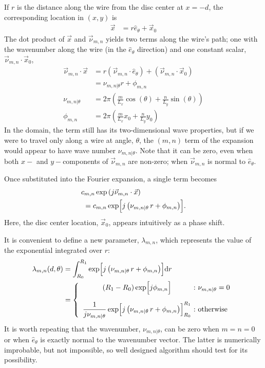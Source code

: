 \documentclass{article}
\def\d{\mathrm{d}}
\def\x{\vec{x}}
\def\eth{\hat{e}_\theta}
\def\vnu{\vec{\nu}_{m,n}}
\def\nuth{\nu_{m,n|\theta}}
\def\pmn{\phi_{m,n}}
\begin{document}
If $r$ is the distance along the wire from the disc center at $x=-d$, the corresponding location in $(x,y)$ is
\begin{align}
\x &= r \eth + \x_0
\end{align}
The dot product of $\x$ and $\vnu$ yields two terms along the wire's path; one with the wavenumber along the wire (in the $\eth$ direction) and one constant scalar, $\vnu \cdot \x_0$,
\begin{align}
\vnu \cdot \x &= r (\vnu \cdot \hat{e}_\theta) + (\vnu \cdot \x_0)\nonumber\\
 &= \nu_{m,n|\theta} r + \pmn\\
\nuth &= 2\pi \left( \frac{m}{L_x} \cos(\theta) + \frac{n}{L_y} \sin(\theta) \right)\\
\pmn &= 2\pi \left( \frac{m}{L_x} x_0 + \frac{n}{L_y} y_0 \right)
\end{align}
In the domain, the term still has its two-dimensional wave properties, but if we were to travel only along a wire at angle, $\theta$, the $(m,n)$ term of the expansion would appear to have wave number $\nuth$.  Note that it can be zero, even when both $x-$ and $y-$components of $\vnu$ are non-zero; when $\vnu$ is normal to $\eth$.

Once substituted into the Fourier expansion, a single term becomes
\begin{align*}
c_{m,n} \exp\left(j \vnu \cdot \x \right)\hspace{-8em}&\\
&= c_{m,n} \exp\Bigl[j \left(\nuth\,r + \pmn \right)\Bigr].
\end{align*}
Here, the disc center location, $\x_0$, appears intuitively as a phase shift.

It is convenient to define a new parameter, $\lambda_{m,n}$, which represents the value of the exponential integrated over $r$:
\begin{align}
\lambda_{m,n}(d,\theta) &= \int_{R_0}^{R_1} \exp\Bigl[ j \left(\nuth\,r + \pmn \right)\Bigr] \d r \nonumber\\
 &= \left\{\begin{array}{c@{\ :\ }l}
 \displaystyle (R_1 - R_0) \exp\Bigl[j \pmn \Bigr] & \nuth = 0  \vspace{1.0em} \\
\displaystyle \frac{1}{j \nuth}\exp\Bigl[j \left(\nuth\,r + \pmn \right)\Bigr]^{R_1}_{R_0} & \mathrm{otherwise}
\end{array}
\right.
\end{align}
It is worth repeating that the wavenumber, $\nuth$, can be zero when $m=n=0$ or when $\eth$ is exactly normal to the wavenumber vector.  The latter is numerically improbable, but not impossible, so  well designed algorithm should test for its possibility.
\end{document}
